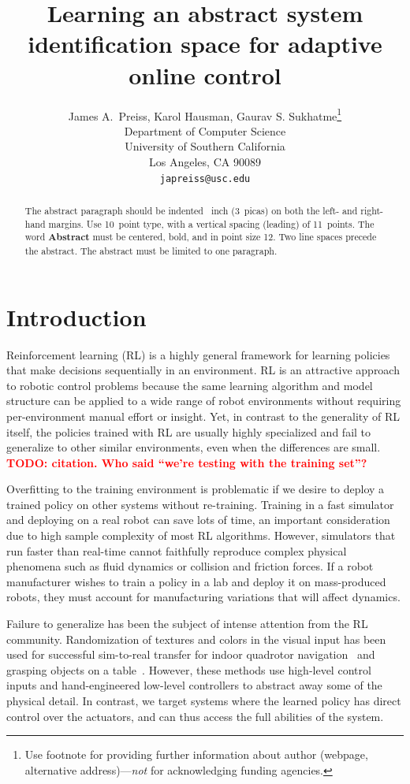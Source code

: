\documentclass{article}
\title{Learning an abstract system identification space for adaptive online control}
\author{
  James A.~Preiss, Karol Hausman, Gaurav S. Sukhatme\thanks{Use footnote for providing further
    information about author (webpage, alternative
    address)---\emph{not} for acknowledging funding agencies.} \\
  Department of Computer Science\\
  University of Southern California\\
  Los Angeles, CA 90089\\
  \texttt{japreiss@usc.edu} \\
}
\newcommand{\TODO}[1]{\textcolor{red}{\textbf{TODO: #1}}}
\begin{document}

\maketitle

\begin{abstract}
  The abstract paragraph should be indented ~inch
  (3~picas) on both the left- and right-hand margins. Use 10~point
  type, with a vertical spacing (leading) of 11~points.  The word
  \textbf{Abstract} must be centered, bold, and in point size 12. Two
  line spaces precede the abstract. The abstract must be limited to
  one paragraph.
\end{abstract}

\section{Introduction}

Reinforcement learning (RL) is a highly general framework for learning policies that make decisions sequentially in an environment.
RL is an attractive approach to robotic control problems
because the same learning algorithm and model structure can be applied to a wide range of robot environments without requiring per-environment manual effort or insight.
Yet, in contrast to the generality of RL itself,
the policies trained with RL are usually highly specialized and fail to generalize to other similar environments, even when the differences are small. \TODO{citation. Who said ``we're testing with the training set''?}

Overfitting to the training environment is problematic if we desire to deploy a trained policy on other systems without re-training.
Training in a fast simulator and deploying on a real robot can save lots of time,
an important consideration due to high sample complexity of most RL algorithms.
However, simulators that run faster than real-time cannot faithfully reproduce complex physical phenomena such as fluid dynamics or collision and friction forces.
If a robot manufacturer wishes to train a policy in a lab and deploy it on mass-produced robots,
they must account for manufacturing variations that will affect dynamics.

Failure to generalize has been the subject of intense attention from the RL community.
Randomization of textures and colors in the visual input has been used for successful sim-to-real transfer
for indoor quadrotor navigation~\citep{sadeghi-cad2rl-rss17}
and grasping objects on a table~\citep{tobin-domainrand-arxiv17}.
However, these methods use high-level control inputs and hand-engineered low-level controllers to abstract away some of the physical detail.
In contrast, we target systems where the learned policy has direct control over the actuators, and can thus access the full abilities of the system.
\end{document}
